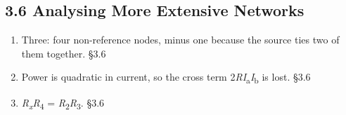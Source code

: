 \documentclass[11pt]{article}
\begin{document}
\begin{keepsection}\subsection{3.6 Analysing More Extensive Networks}

\begin{enumerate}
\item Three: four non-reference nodes, minus one because the source ties two of them together. \hfill{\small\color{FAUblue}§3.6}
\item Power is quadratic in current, so the cross term 2\textit{RI}\textsubscript{a}\textit{I}\textsubscript{b} is lost. \hfill{\small\color{FAUblue}§3.6}
\item \textit{R}\textsubscript{\textit{x}}\textit{R}\textsubscript{4} = \textit{R}\textsubscript{2}\textit{R}\textsubscript{3}. \hfill{\small\color{FAUblue}§3.6}
\end{enumerate}

\end{keepsection}
\end{document}
